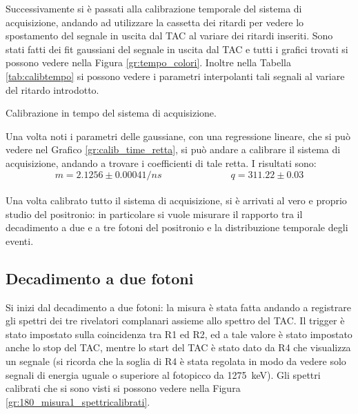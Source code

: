 Successivamente si è passati alla calibrazione temporale del sistema di acquisizione, andando ad utilizzare la cassetta dei ritardi per vedere lo spostamento del
segnale in uscita dal TAC al variare dei ritardi inseriti. Sono stati fatti dei fit gaussiani del segnale in uscita dal TAC e tutti i grafici trovati si possono
vedere nella Figura \ref{gr:tempo_colori}. Inoltre nella Tabella \ref{tab:calibtempo} si possono vedere i parametri interpolanti tali segnali
al variare del ritardo introdotto.\\

\begin{table}[h]
	\centering
	
	\caption{Calibrazione in tempo del sistema di acquisizione.}
	\label{tab:calibtempo}
\end{table}

Una volta noti i parametri delle gaussiane, con una regressione lineare, che si può vedere nel Grafico \ref{gr:calib_time_retta}, si può andare a calibrare il sistema di
acquisizione, andando a trovare i coefficienti di tale retta. I risultati sono:
$$ m= 2.1256 \pm 0.0004 1/ns \hspace{3cm} q = 311.22 \pm 0.03$$\\



Una volta calibrato tutto il sistema di acquisizione, si è arrivati al vero e proprio studio del positronio: in particolare si vuole misurare il rapporto tra il decadimento
a due e a tre fotoni del positronio e la distribuzione temporale degli eventi.\\

\FloatBarrier
\subsection{Decadimento a due fotoni}

Si inizi dal decadimento a due fotoni: la misura è stata fatta andando a registrare gli spettri dei tre rivelatori complanari assieme allo spettro del TAC. Il
trigger è stato impostato sulla coincidenza tra R1 ed R2, ed a tale valore è stato impostato anche lo stop del TAC, mentre lo start del TAC è stato dato da R4 che visualizza
un segnale (si ricorda che la soglia di R4 è stata regolata in modo da vedere solo segnali di energia uguale o superiore al fotopicco da 1275~keV). Gli spettri calibrati che
si sono visti si possono vedere nella Figura \ref{gr:180_misura1_spettricalibrati}.\\


